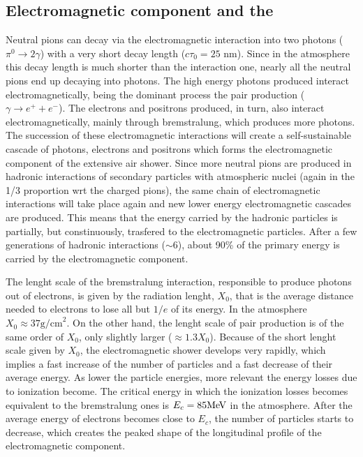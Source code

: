 \subsection[Electromagnetic component and the \xmax]{\boldmath Electromagnetic component and the \xmax}
\label{sec:showers:phen:em}


Neutral pions can decay via the electromagnetic interaction into two photons ($\pi^0\rightarrow 2\gamma$)
with a very short decay length ($c\tau_0=25$ nm). Since in the atmosphere this decay length
is much shorter than the interaction one, nearly all the neutral pions end up decaying into
photons. The high energy photons produced interact electromagnetically, being the dominant
process the pair production ($\gamma\rightarrow e^++e^-$). The electrons and positrons
produced, in turn, also interact electromagnetically, mainly through bremstralung, which
produces more photons. The succession of these electromagnetic interactions
will create a self-sustainable cascade of photons, electrons and positrons
which forms the electromagnetic component of the extensive air shower.
Since more neutral pions are produced in hadronic interactions of secondary
particles with atmospheric nuclei (again in the 1/3 proportion wrt the charged pions),
the same chain of electromagnetic interactions will take place again
and new lower energy electromagnetic cascades are produced.
This means that the energy carried by the hadronic particles
is partially, but constinuously, trasfered to the electromagnetic particles.
After a few generations of hadronic interactions ($\sim 6$), about 90\% of
the primary energy is carried by the electromagnetic component.


The lenght scale of the bremstralung interaction, responsible to produce photons out of
electrons, is given by the radiation lenght, $X_0$, that is the average distance needed
to electrons to lose all but $1/e$ of its energy. In the atmosphere $X_0\approx 37\text{g/cm}^2$.
On the other hand, the lenght scale of pair production is of the same order
of $X_0$, only slightly larger ($\approx 1.3 X_0$). Because of the short lenght scale
given by $X_0$, the electromagnetic shower develops very rapidly, which
implies a fast increase of the number of particles and a fast decrease of their
average energy. As lower the particle energies, more relevant the energy losses
due to ionization become. The critical energy in which the ionization losses
becomes equivalent to the bremstralung ones is $E_c = 85 \mbox{Me\kern-0.1em V}$ in the
atmosphere. After the average energy of electrons becomes close to $E_c$,
the number of particles starts to decrease, which creates the peaked shape
of the longitudinal profile of the electromagnetic component.

